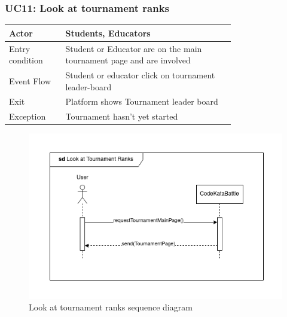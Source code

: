 \newpage
\subsubsection{UC11: Look at tournament ranks}
\begin{center}
    \begin{longtable}{lp{0.75\linewidth}}
        \hline
            Actor & Students, Educators\\
        \hline
            Entry condition & Student or Educator are on the main tournament page and are involved\\
        \hline
            Event Flow & 	Student or educator click on tournament leader-board\\
        \hline
            Exit & 	Platform shows Tournament leader board\\
        \hline
            Exception & Tournament hasn't yet started \\
        \hline
    \end{longtable}
\end{center}

\begin{figure}[H]
    \centering
    \includegraphics[width=1\linewidth]{misc//Images//UC Diagrams/UC11.png}
    \caption{Look at tournament ranks sequence diagram}
    \label{fig:enter-label}
\end{figure}

\newpage
